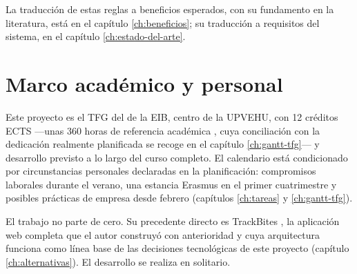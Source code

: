 La traducción de estas reglas a beneficios esperados, con su fundamento en la literatura, está en el capítulo \ref{ch:beneficios}; su traducción a requisitos del sistema, en el capítulo \ref{ch:estado-del-arte}.

\section{Marco académico y personal}
\label{sec:contexto-marco}

Este proyecto es el \ac{TFG} del \thesisDegree{} de la \ac{EIB}, centro de la \ac{UPVEHU}, con 12 créditos \ac{ECTS} —unas 360 horas de referencia académica \parencite{rd-1125-2003}, cuya conciliación con la dedicación realmente planificada se recoge en el capítulo \ref{ch:gantt-tfg}— y desarrollo previsto a lo largo del curso \thesisCourse{} completo.
El calendario está condicionado por circunstancias personales declaradas en la planificación: compromisos laborales durante el verano, una estancia Erasmus en el primer cuatrimestre y posibles prácticas de empresa desde febrero (capítulos \ref{ch:tareas} y \ref{ch:gantt-tfg}).

El trabajo no parte de cero.
Su precedente directo es TrackBites \parencite{deleanu-trackbites}, la aplicación web completa que el autor construyó con anterioridad y cuya arquitectura funciona como línea base de las decisiones tecnológicas de este proyecto (capítulo \ref{ch:alternativas}).
El desarrollo se realiza en solitario.
